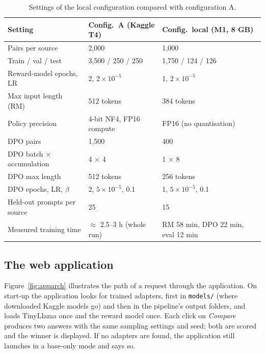 \begin{table}[!htbp]
\centering
\caption[Local configuration vs.\ configuration A]{Settings of the local configuration compared with configuration A.}
\label{tab:local-hparams}
\small
\begin{tabularx}{\textwidth}{@{}L{5.2cm}ZZ@{}}
\toprule
\textbf{Setting} & \textbf{Config.\ A (Kaggle T4)} & \textbf{Config.\ local (M1, 8 GB)}\\
\midrule
Pairs per source & 2,000 & 1,000\\
Train / val / test & 3,500 / 250 / 250 & 1,750 / 124 / 126\\
Reward-model epochs, LR & 2, $2\times10^{-5}$ & 1, $2\times10^{-5}$\\
Max input length (RM) & 512 tokens & 384 tokens\\
Policy precision & 4-bit NF4, FP16 compute & FP16 (no quantisation)\\
DPO pairs & 1,500 & 400\\
DPO batch $\times$ accumulation & 4 $\times$ 4 & 1 $\times$ 8\\
DPO max length & 512 tokens & 256 tokens\\
DPO epochs, LR, $\beta$ & 2, $5\times10^{-5}$, 0.1 & 1, $5\times10^{-5}$, 0.1\\
Held-out prompts per source & 25 & 15\\
Measured training time & $\approx$ 2.5--3 h (whole run) & RM 58 min, DPO 22 min, eval 12 min\\
\bottomrule
\end{tabularx}
\end{table}

\subsection{The web application}
Figure~\ref{fig:apparch} illustrates the path of a request through the application. On start-up the application looks for trained adapters, first in \texttt{models/} (where downloaded Kaggle models go) and then in the pipeline's output folders, and loads TinyLlama once and the reward model once. Each click on \emph{Compare} produces two answers with the same sampling settings and seed; both are scored and the winner is displayed. If no adapters are found, the application still launches in a base-only mode and says so.

